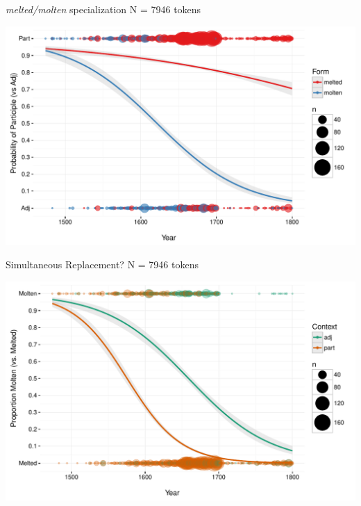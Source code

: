 \documentclass[hyperref={pdfpagelabels=false}]{beamer}
\begin{document}
\begin{frame}{\textsl{melted/molten} specialization N =  7946 tokens}

\includegraphics[width=1.128\textwidth]{ContextByDateUnbinnedWithDots2.pdf}
\end{frame}


\begin{frame}{Simultaneous Replacement? N =  7946 tokens}

\includegraphics[width=1.128\textwidth]{FormByDateUnbinnedWithDots2.pdf}
\end{frame}
\end{document}

